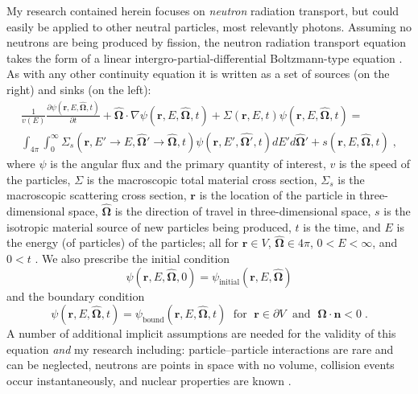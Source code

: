 My research contained herein focuses on \textit{neutron} radiation transport, but could easily be applied to other neutral particles, most relevantly photons.
Assuming no neutrons are being produced by fission, the neutron radiation transport equation takes the form of a linear intergro-partial-differential Boltzmann-type equation \cite{duderstadt_hamilton}.
As with any other continuity equation it is written as a set of sources (on the right) and sinks (on the left):
\begin{multline}
    \label{eq:fullNTE}
    \frac{1}{v(E)}\frac{\partial \psi(\boldsymbol{r}, E, \boldsymbol{\hat{\Omega}},t)}{\partial t} + \boldsymbol{\hat{\Omega}} \cdot \nabla \psi(\boldsymbol{r}, E, \boldsymbol{\hat{\Omega}},t) + \Sigma(\bm{r}, E, t) \psi(\boldsymbol{r}, E, \boldsymbol{\hat{\Omega}},t) = \\
    \int_{4\pi}\int_{0}^{\infty}\Sigma_s(\boldsymbol{r}, E'\rightarrow E, \boldsymbol{\hat{\Omega}'} \rightarrow \boldsymbol{\hat{\Omega}}, t)
    \psi(\boldsymbol{r}, E', \boldsymbol{\hat{\Omega'}},t) dE' d\boldsymbol{\hat{\Omega}'} +
    s(\boldsymbol{r}, E, \boldsymbol{\hat{\Omega}},t) \;,
\end{multline}
where $\psi$ is the angular flux and the primary quantity of interest, $v$ is the speed of the particles, $\Sigma$ is the macroscopic total material cross section, $\Sigma_s$ is the macroscopic scattering cross section, $\boldsymbol{r}$ is the location of the particle in three-dimensional space, $\boldsymbol{\hat{\Omega}}$ is the direction of travel in three-dimensional space, $s$ is the isotropic material source of new particles being produced, $t$ is the time, and $E$ is the energy (of particles) of the particles; all for $\boldsymbol{r} \in V$, $\boldsymbol{\hat{\Omega}} \in 4\pi$, $0<E<\infty$, and $0<t$ \cite{duderstadt_hamilton}. We also prescribe the initial condition
\begin{equation}
    \psi(\boldsymbol{r}, E, \boldsymbol{\hat{\Omega}},0) = \psi_{\text{initial}}(\boldsymbol{r}, E, \boldsymbol{\hat{\Omega}})
\end{equation}
and the boundary condition
\begin{equation}
    \psi(\boldsymbol{r}, E, \boldsymbol{\hat{\Omega}},t) = \psi_{\text{bound}}(\boldsymbol{r}, E, \boldsymbol{\hat{\Omega}},t) \; \text{ for } \; \boldsymbol{r} \in \partial V \; \text{ and } \; \boldsymbol{\hat{\Omega}} \cdot \boldsymbol{n} < 0 \;.
\end{equation}
A number of additional implicit assumptions are needed for the validity of this equation \textit{and} my research including: particle--particle interactions are rare and can be neglected, neutrons are points in space with no volume, collision events occur instantaneously, and nuclear properties are known \cite{lewis_computational_1984, duderstadt_hamilton}.

